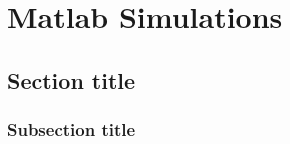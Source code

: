 \documentclass[a4paper,11pt,oneside]{book}
\begin{document}
			
			
			\chapter{Matlab Simulations}
			
			\section{Section title}
			\subsection {Subsection title}
			
			
			
			
			
			
			
			{}
			
			
			
\end{document}
